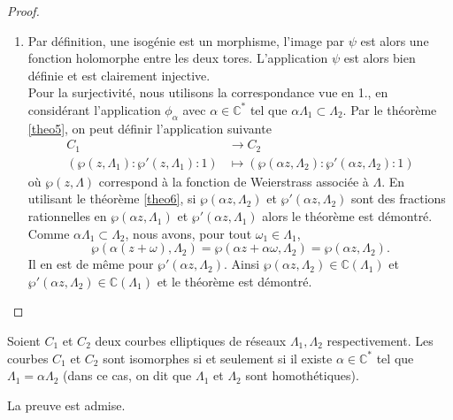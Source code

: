\documentclass[a4paper]{article}
\begin{document}
\begin{proof}
\begin{enumerate}
\item Par définition, une isogénie est un morphisme, l'image par $\psi$ est alors une fonction holomorphe entre les deux tores. L'application $\psi$ est alors bien définie et est clairement injective. \\
Pour la surjectivité, nous utilisons la correspondance vue en 1., en considérant l'application $\phi_{\alpha}$ avec $\alpha \in \mathbb{C}^*$ tel que $\alpha \Lambda_{1} \subset \Lambda_{2}$.
Par le théorème \ref{theo5}, on peut définir l'application suivante
\begin{align*}
C_{1} &\rightarrow C_{2} \\
(\wp(z,\Lambda_{1}):\wp'(z,\Lambda_{1}):1) &\mapsto (\wp(\alpha z,\Lambda_{2}):\wp'(\alpha z,\Lambda_{2}):1)
\end{align*}
où $\wp(z,\Lambda)$ correspond à la fonction de Weierstrass associée à $\Lambda$. En utilisant le théorème \ref{theo6}, si $\wp(\alpha z,\Lambda_{2})$ et $\wp'(\alpha z,\Lambda_{2})$ sont des fractions rationnelles en $\wp(\alpha z,\Lambda_{1})$ et $\wp'(\alpha z,\Lambda_{1})$ alors le théorème est démontré. \\
Comme $\alpha \Lambda_{1} \subset \Lambda_{2}$, nous avons, pour tout $\omega_{1} \in \Lambda_{1}$,
\begin{equation*}
\wp(\alpha(z+\omega),\Lambda_{2})=\wp(\alpha z+\alpha \omega,\Lambda_{2})=\wp(\alpha z,\Lambda_{2}).
\end{equation*}
Il en est de même pour $\wp'(\alpha z,\Lambda_{2})$.
Ainsi $\wp(\alpha z,\Lambda_{2}) \in \mathbb{C}(\Lambda_{1})$ et $\wp'(\alpha z,\Lambda_{2}) \in \mathbb{C}(\Lambda_{1})$ et le théorème est démontré.
\end{enumerate} 
\end{proof}



\begin{cor} \label{cor2}
Soient $C_{1}$ et $C_{2}$ deux courbes elliptiques de réseaux $\Lambda_{1},\Lambda_{2}$ respectivement. Les courbes $C_{1}$ et $C_{2}$ sont isomorphes si et seulement si il existe $\alpha \in \mathbb{C}^*$ tel que
$\Lambda_{1}=\alpha \Lambda_{2}$ (dans ce cas, on dit que $\Lambda_1$ et $\Lambda_2$ sont homothétiques).
\end{cor}

\noindent La preuve est admise.
\end{document}
